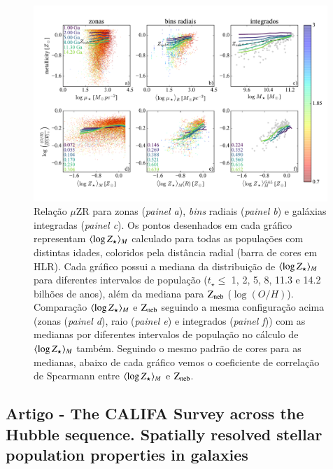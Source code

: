 \begin{figure}
	\centering
	\includegraphics[width=0.99\textwidth]{figuras/stellar_muZR_realsample.pdf}
	\caption[Relação $\mu$ZR e comparação entre as metalicidades.]
	{Relação $\mu$ZR para zonas ({\em painel a}), {\em bins} radiais ({\em painel b}) e galáxias
integradas ({\em painel c}). Os pontos desenhados em cada gráfico representam $\meanM{\log Z_\star}$
calculado para todas as populações com distintas idades, coloridos pela distância radial (barra de
cores em HLR). Cada gráfico possui a mediana da distribuição de $\meanM{\log Z_\star}$ para
diferentes intervalos de população ($t_\star \leq$ 1, 2, 5, 8, 11.3 e 14.2 bilhões de anos), além
da mediana para $\mathrm{Z}_{\mathrm{neb}}$ ($\log(O/H)$). Comparação $\meanM{\log Z_\star}$ e
$\mathrm{Z}_{\mathrm{neb}}$ seguindo a mesma configuração acima (zonas ({\em painel d}), raio ({\em painel e}) e
integrados ({\em painel f})) com as medianas por diferentes intervalos de população no cálculo de
$\meanM{\log Z_\star}$ também. Seguindo o mesmo padrão de cores para as medianas, abaixo de cada
gráfico vemos o coeficiente de correlação de Spearmann entre $\meanM{\log Z_\star}$ e $\mathrm{Z}_{\mathrm{neb}}$.}
	\label{fig:ZstarvsZneb}
\end{figure}

\subsection{Artigo - The CALIFA Survey across the Hubble sequence. Spatially resolved stellar
population properties in galaxies}

